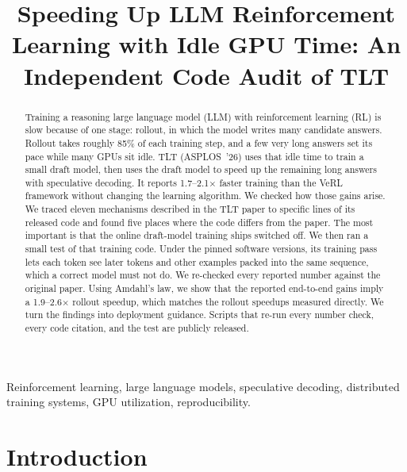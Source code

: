 \documentclass[conference]{IEEEtran}
\newcommand{\x}{\ensuremath{\times}}
\begin{document}
\title{Speeding Up LLM Reinforcement Learning with Idle GPU Time: An Independent Code Audit of TLT}

\author{
}

\maketitle

\begin{abstract}
Training a reasoning large language model (LLM) with reinforcement learning (RL) is slow because of one stage: rollout, in which the model writes many candidate answers. Rollout takes roughly 85\% of each training step, and a few very long answers set its pace while many GPUs sit idle. TLT (ASPLOS~'26) uses that idle time to train a small draft model, then uses the draft model to speed up the remaining long answers with speculative decoding. It reports 1.7--2.1\x{} faster training than the VeRL framework without changing the learning algorithm. We checked how those gains arise. We traced eleven mechanisms described in the TLT paper to specific lines of its released code and found five places where the code differs from the paper. The most important is that the online draft-model training ships switched off. We then ran a small test of that training code. Under the pinned software versions, its training pass lets each token see later tokens and other examples packed into the same sequence, which a correct model must not do. We re-checked every reported number against the original paper. Using Amdahl's law, we show that the reported end-to-end gains imply a 1.9--2.6\x{} rollout speedup, which matches the rollout speedups measured directly. We turn the findings into deployment guidance. Scripts that re-run every number check, every code citation, and the test are publicly released.
\end{abstract}

\begin{IEEEkeywords}
Reinforcement learning, large language models, speculative decoding, distributed training systems, GPU utilization, reproducibility.
\end{IEEEkeywords}

\section{Introduction}
\label{sec:intro}
\end{document}
